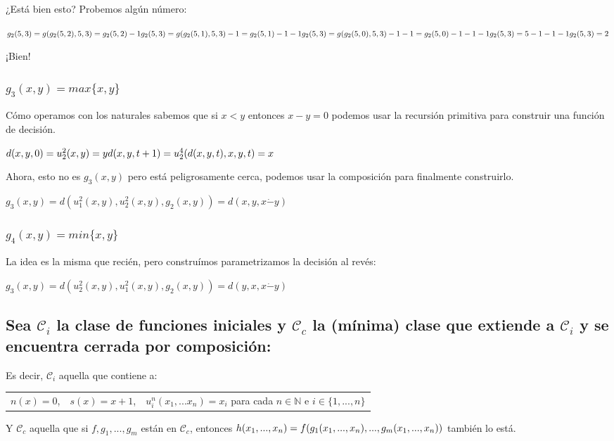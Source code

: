 \documentclass[11pt]{article} %
\newlength{\desarrollolen}
\newcommand{\desarrollo}[2][3em]{

    \hspace{2em}
    \addtolength{\desarrollolen}{-#1}
    \begin{minipage}{\desarrollolen}
        #2
    \end{minipage}
    \addtolength{\desarrollolen}{#1}

}
\newcommand{\nat}{\mathbb{N}}
\newcommand{\Ccur}{\mathcal{C}}
\begin{document}
¿Está bien esto? Probemos algún número:
\desarrollo{$
g_2(5, 3) = g(g_2(5, 2), 5, 3) = g_2(5, 2) - 1 \\
g_2(5, 3) = g(g_2(5, 1), 5, 3) - 1 = g_2(5, 1) - 1 - 1 \\
g_2(5, 3) = g(g_2(5, 0), 5, 3) - 1 - 1 = g_2(5, 0) - 1 - 1 - 1 \\
g_2(5, 3) = 5 - 1 - 1 - 1 \\
g_2(5, 3) = 2
$}

¡Bien!

\subsubsection{$g_3(x,y)=max\{x,y\}$}

Cómo operamos con los naturales sabemos que si $x < y$ entonces $x - y = 0$ podemos usar la recursión primitiva para construir una función de decisión.
\desarrollo{$
d(x, y, 0) = u^2_2(x, y) = y \\
d(x, y, t+1) = u^4_2(d(x, y, t), x, y, t) = x
$}

Ahora, esto no es $g_3(x,y)$ pero está peligrosamente cerca, podemos usar la composición para finalmente construirlo.
\desarrollo{$
g_3(x,y) = d(u^2_1(x, y), u^2_2(x, y), g_2(x,y)) = d(x, y, x \dot- y)
$}

\subsubsection{$g_4(x,y)=min\{x,y\}$}

La idea es la misma que recién, pero construímos parametrizamos la decisión al revés:
\desarrollo{$
g_3(x,y) = d(u^2_2(x,y), u^2_1(x,y), g_2(x,y)) = d(y, x, x \dot- y)
$}

\subsection{Sea $\Ccur_i$ la clase de funciones iniciales y $\Ccur_c$ la (mínima) clase que extiende a $\Ccur_i$ y se encuentra cerrada por composición:}

Es decir, $\Ccur_i$ aquella que contiene a:

\begin{tabular}{lcr}
$n(x)=0$, &
$s(x)=x+1$, &
$u^n_i(x_1,...x_n)=x_i$ para cada $n \in \nat$ e $i \in \{1, ..., n\}$
\end{tabular}

Y $\Ccur_c$ aquella que si $f, g_1, ..., g_m$ están en $\Ccur_c$, entonces $h(x_1, ..., x_n) = f(g_1(x_1, ..., x_n), ...,\\ g_m(x_1, ..., x_n))$ también lo está.
\end{document}
